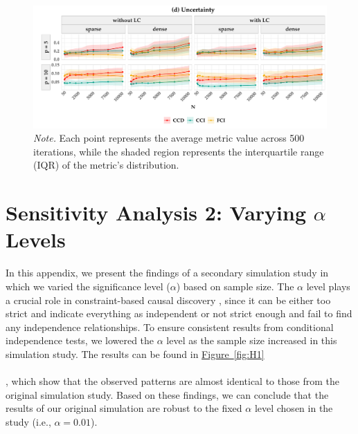 \documentclass[twoside, 11pt]{article}
\newcommand*{\figref}[2][]{%
  \hyperref[{fig:#2}]{%
    Figure~\ref*{fig:#2}%
    \ifx\\#1\\%
    \else
      #1%
    \fi
  }%
}
\begin{document}
\begin{appendices}
\begin{figure}[H]\ContinuedFloat
    \centering
        \includegraphics[width=1\textwidth]{figures/samplingbeta_unc.pdf}
        \caption*{\small{\textit{Note.} Each point represents the average metric value across 500 iterations, while the shaded region represents the interquartile range (IQR) of the metric's distribution.}}
\end{figure}    

\restoregeometry

\newpage
\section{Sensitivity Analysis 2: Varying \texorpdfstring{$\alpha$}{a} Levels}\label{varyingalpha}
In this appendix, we present the findings of a secondary simulation study in which we varied the significance level ($\alpha$) based on sample size. The $\alpha$ level plays a crucial role in constraint-based causal discovery \citep{spirtes2000}, since it can be either too strict and indicate everything as independent or not strict enough and fail to find any independence relationships. To ensure consistent results from conditional independence tests, we lowered the $\alpha$ level as the sample size increased in this simulation study. The results can be found in \figref[]{H1}, which show that the observed patterns are almost identical to those from the original simulation study. Based on these findings, we can conclude that the results of our original simulation are robust to the fixed $\alpha$ level chosen in the study (i.e., $\alpha = 0.01$). 


\vspace{5mm}


\end{appendices}
\end{document}
